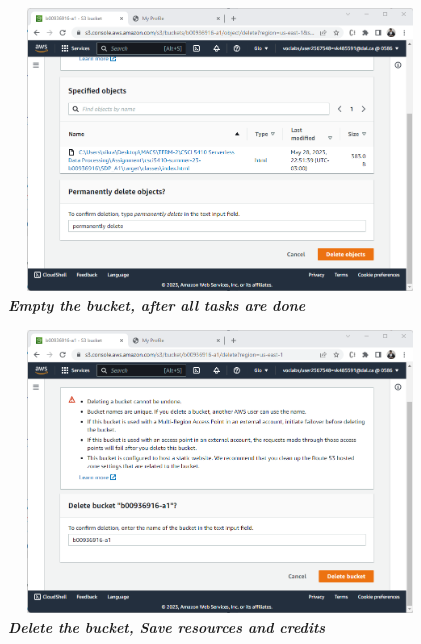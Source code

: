 \begin{figure}[htp]
    \centering
    \includegraphics[scale=1, width=15cm,height=7.5cm]{PROBLEM 2/Snaps/11. Empty Bucket.png}
    \caption{\textbf{\textit{ Empty the bucket, after all tasks are done}}}
    \label{fig:empty_bucket}
\end{figure}

\begin{figure}[htp]
    \centering
    \includegraphics[scale=1, width=15cm,height=7.5cm]{PROBLEM 2/Snaps/12. Delete bucket.png}
    \caption{\textbf{\textit{ Delete the bucket, Save resources and credits}}}
    \label{fig:delete_bucket}
\end{figure}


\newpage